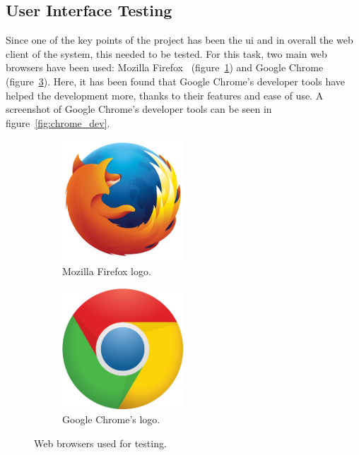 \subsection{User Interface Testing}

Since one of the key points of the project has been the \acrlong{ui} and in overall the web client
of the system, this needed to be tested. For this task, two main web browsers have been used:
Mozilla Firefox~\cite{firefox_web} (figure~\ref{subfig:firefox}) and Google Chrome~\cite{chrome_web}
(figure~\ref{subfig:chrome}). Here, it has been found that Google Chrome's developer tools have
helped the development more, thanks to their features and ease of use. A screenshot of Google
Chrome's developer tools can be seen in figure~\ref{fig:chrome_dev}.

\begin{figure}[!htbp]
	\centering
	\begin{subfigure}{0.45\textwidth}
		\centering
		\includegraphics[width=0.5\textwidth]{fig/firefox}
		\caption{Mozilla Firefox logo.}\label{subfig:firefox}
	\end{subfigure}\quad
	\begin{subfigure}{0.45\textwidth}
		\centering
		\includegraphics[width=0.5\textwidth]{fig/chrome}
		\caption{Google Chrome's logo.}\label{subfig:chrome}
	\end{subfigure}\quad
	\caption{Web browsers used for testing.}
\end{figure}

